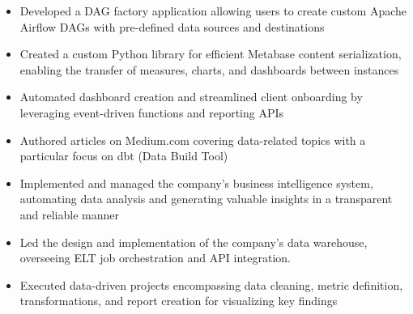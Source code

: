 \documentclass[10pt,a4paper,ragged2e,withhyper]{altacv}
\begin{document}
\begin{paracol}{2}

%



\begin{itemize}

\item Developed a DAG factory application allowing users to create custom Apache Airflow DAGs with pre-defined data sources and destinations

\item Created a custom Python library for efficient Metabase content serialization, enabling the transfer of measures, charts, and dashboards between instances

\item Automated dashboard creation and streamlined client onboarding by leveraging event-driven functions and reporting APIs

\item Authored articles on Medium.com covering data-related topics with a particular focus on dbt (Data Build Tool)

\end{itemize}

\divider

\begin{itemize}

\item Implemented and managed the company's business intelligence system, automating data analysis and generating valuable insights in a transparent and reliable manner

\item Led the design and implementation of the company's data warehouse, overseeing ELT job orchestration and API integration.

\item Executed data-driven projects encompassing data cleaning, metric definition, transformations, and report creation for visualizing key findings


\end{itemize}
\end{paracol}
\end{document}
